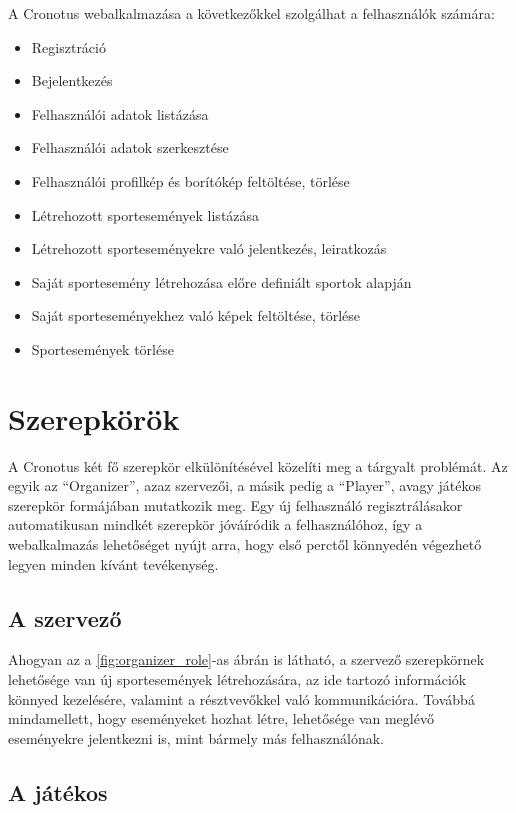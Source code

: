 A Cronotus webalkalmazása a következőkkel szolgálhat a felhasználók számára:

\begin{itemize}
  \item Regisztráció
  \item Bejelentkezés
  \item Felhasználói adatok listázása
  \item Felhasználói adatok szerkesztése
  \item Felhasználói profilkép és borítókép feltöltése, törlése
  \item Létrehozott sportesemények listázása
  \item Létrehozott sporteseményekre való jelentkezés, leiratkozás
  \item Saját sportesemény létrehozása előre definiált sportok alapján
  \item Saját sporteseményekhez való képek feltöltése, törlése
  \item Sportesemények törlése
\end{itemize}

\section{Szerepkörök}

  A Cronotus két fő szerepkör elkülönítésével közelíti meg a tárgyalt problémát. Az egyik az ``Organizer'', azaz szervezői, a másik pedig
  a ``Player'', avagy játékos szerepkör formájában mutatkozik meg. Egy új felhasználó regisztrálásakor automatikusan mindkét szerepkör
  jóváíródik a felhasználóhoz, így a webalkalmazás lehetőséget nyújt arra, hogy első perctől könnyedén végezhető legyen minden kívánt tevékenység.

  \subsection{A szervező}

  Ahogyan az a \ref{fig:organizer_role}-as ábrán is látható, a szervező szerepkörnek lehetősége van új sportesemények létrehozására,
  az ide tartozó információk könnyed kezelésére, valamint a résztvevőkkel való kommunikációra.
  Továbbá mindamellett, hogy eseményeket hozhat létre, lehetősége van meglévő eseményekre jelentkezni is, mint bármely más felhasználónak.

  \subsection{A játékos}


